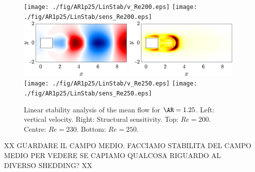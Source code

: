 \begin{figure}
  \centering
  \texttt{[image: ./fig/AR1p25/LinStab/v\_Re200.eps]}
  \texttt{[image: ./fig/AR1p25/LinStab/sens\_Re200.eps]}
  \includegraphics[width=0.49\textwidth]{./fig/AR1p25/LinStab/v_Re230.eps}
  \includegraphics[width=0.49\textwidth]{./fig/AR1p25/LinStab/sens_Re230.eps}
  \texttt{[image: ./fig/AR1p25/LinStab/v\_Re250.eps]}
  \texttt{[image: ./fig/AR1p25/LinStab/sens\_Re250.eps]}
  \caption{Linear stability analysis of the mean flow for $\AR=1.25$. Left: vertical velocity. Right: Structural sensitivity. Top: $Re=200$. Centre: $Re=230$. Bottom: $Re=250$.}
  \label{fig:MF_stab}
\end{figure}

XX GUARDARE IL CAMPO MEDIO. FACCIAMO STABILITA DEL CAMPO MEDIO PER VEDERE SE CAPIAMO QUALCOSA RIGUARDO AL DIVERSO SHEDDING? XX


